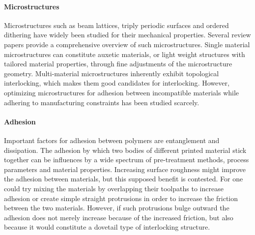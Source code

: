 \paragraph{Microstructures}
Microstructures such as beam lattices, triply periodic surfaces and ordered dithering have widely been studied for their mechanical properties.
Several review papers provide a comprehensive overview of such microstructures.\cite{Cadman2013,Zhang2018a,tamburrino2018}
Single material microstructures can constitute auxetic materials, %
or light weight structures with tailored material properties, through fine adjustments of the microstructure geometry. %
Multi-material microstructures inherently exhibit topological interlocking, which makes them good candidates for interlocking\cite{freund2019determination}.
However, optimizing microstructures for adhesion between incompatible materials while adhering to  manufacturing constraints has been studied scarcely.




\paragraph{Adhesion}

Important factors for adhesion between polymers are entanglement and dissipation\cite{abbott2015adhesion}.
The adhesion by which two bodies of different  printed material stick together can be influences by a wide spectrum of pre-treatment methods, process parameters and material properties\cite{freund2019determination,lopes2018multi}.
Increasing surface roughness might improve the adhesion between materials\cite{huttenbach1991interface,gent1990model}, but this supposed benefit is contested\cite{abbott2015adhesion}.
For  one could try mixing the materials by overlapping their toolpaths to increase adhesion or create simple straight protrusions in order to increase the friction between the two materials\cite{tamburrino19}.
However, if such protrusions bulge outward the adhesion does not merely increase because of the increased friction, but also because it would constitute a dovetail type of interlocking structure.

